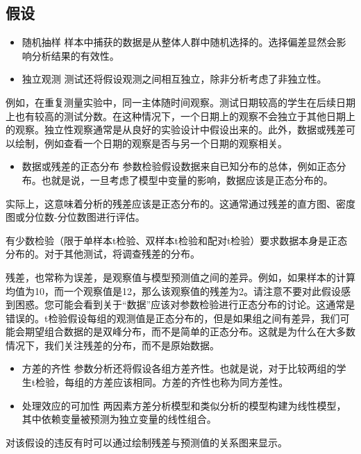 \documentclass[]{book}
\providecommand{\tightlist}{%
  \setlength{\itemsep}{0pt}\setlength{\parskip}{0pt}}
\begin{document}
\hypertarget{ux5047ux8bbe}{%
\subsection{假设}\label{ux5047ux8bbe}}

\begin{itemize}
\item
  随机抽样
  样本中捕获的数据是从整体人群中随机选择的。选择偏差显然会影响分析结果的有效性。
\item
  独立观测
  测试还将假设观测之间相互独立，除非分析考虑了非独立性。
\end{itemize}

例如，在重复测量实验中，同一主体随时间观察。测试日期较高的学生在后续日期上也有较高的测试分数。在这种情况下，一个日期上的观察不会独立于其他日期上的观察。独立性观察通常是从良好的实验设计中假设出来的。此外，数据或残差可以绘制，例如查看一个日期的观察是否与另一个日期的观察相关。

\begin{itemize}
\tightlist
\item
  数据或残差的正态分布
  参数检验假设数据来自已知分布的总体，例如正态分布。也就是说，一旦考虑了模型中变量的影响，数据应该是正态分布的。
\end{itemize}

实际上，这意味着分析的残差应该是正态分布的。这通常通过残差的直方图、密度图或分位数-分位数图进行评估。

有少数检验（限于单样本t检验、双样本t检验和配对t检验）要求数据本身是正态分布的。对于其他测试，将调查残差的分布。

残差，也常称为误差，是观察值与模型预测值之间的差异。例如，如果样本的计算均值为10，而一个观察值是12，那么该观察值的残差为2。请注意不要对此假设感到困惑。您可能会看到关于``数据''应该对参数检验进行正态分布的讨论。这通常是错误的。t检验假设每组的观测值是正态分布的，但是如果组之间有差异，我们可能会期望组合数据的是双峰分布，而不是简单的正态分布。这就是为什么在大多数情况下，我们关注残差的分布，而不是原始数据。

\begin{itemize}
\item
  方差的齐性
  参数分析还将假设各组方差齐性。也就是说，对于比较两组的学生t检验，每组的方差应该相同。方差的齐性也称为同方差性。
\item
  处理效应的可加性
  两因素方差分析模型和类似分析的模型构建为线性模型，其中依赖变量被预测为独立变量的线性组合。
\end{itemize}

对该假设的违反有时可以通过绘制残差与预测值的关系图来显示。
\end{document}
